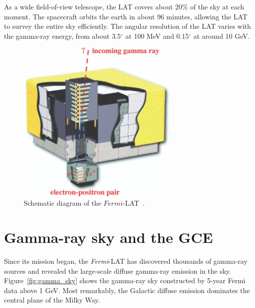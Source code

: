 \documentclass[doublespace,nopageskip]{VTthesis} %
\begin{document}
As a wide field-of-view telescope, the LAT covers about 20\% of the sky at each moment. The spacecraft orbits the earth in about 96 minutes, allowing the LAT to survey the entire sky efficiently. The angular resolution of the LAT varies with the gamma-ray energy, from about 3.5$^\circ$ at 100 MeV and 0.15$^\circ$ at around 10 GeV.

\begin{figure}[htb]
    \centering
    \includegraphics[width=0.7\textwidth]{Figures/Intro/lat.jpg}
    \caption{Schematic diagram of the $Fermi$-LAT~\cite{2009ApJ...697.1071A}.}
    \label{fig:lat}
\end{figure}

\section{Gamma-ray sky and the GCE}

Since its mission began, the \textit{Fermi}-LAT has discovered thousands of gamma-ray sources and revealed the large-scale diffuse gamma-ray emission in the sky. Figure~\ref{fig:gamma_sky} shows the gamma-ray sky constructed by 5-year Fermi data above 1 GeV. Most remarkably, the Galactic diffuse emission dominates the central plane of the Milky Way.
\end{document}
